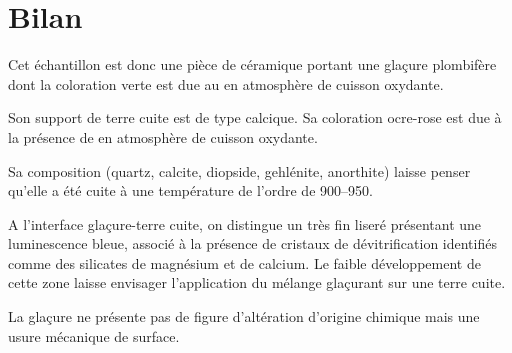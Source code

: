 \section{Bilan}

Cet échantillon est donc une pièce de céramique portant une 
glaçure plombifère dont la coloration verte est due au  
en atmosphère de cuisson oxydante.

Son support de terre cuite est de type calcique. Sa coloration 
ocre-rose est due à la présence de  en atmosphère de 
cuisson oxydante.

Sa composition \cristallo (quartz, calcite, diopside, 
gehlénite, anorthite) laisse penser qu'elle a été cuite à une 
température de l'ordre de 
\SIrange[range-phrase=\ à\ ]{900}{950}{\degC}.

A l'interface glaçure-terre cuite, on distingue un très fin liseré 
présentant une luminescence bleue, associé à la présence de cristaux 
de dévitrification identifiés comme des silicates de magnésium et de 
calcium. Le faible développement de cette zone laisse envisager 
l'application du mélange glaçurant sur une terre cuite.

La glaçure ne présente pas de figure d'altération d'origine chimique 
mais une usure mécanique de surface.
